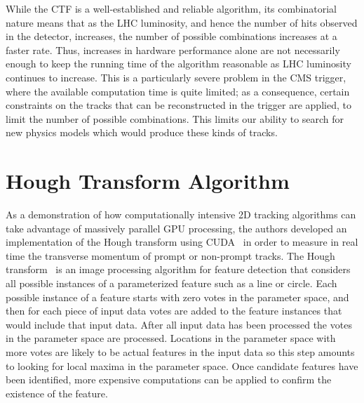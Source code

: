 \documentclass[preprint,sort&compress]{elsarticle}
\begin{document}
While the CTF is a well-established and reliable algorithm, its combinatorial nature means that as the LHC
luminosity, and hence the number of hits observed in the detector, increases, the number of possible
combinations increases at a faster rate. Thus, increases in hardware performance alone are not necessarily
enough to keep the running time of the algorithm reasonable as LHC luminosity continues to increase. This is a
particularly severe problem in the CMS trigger, where the available computation time is quite limited; as a
consequence, certain constraints on the tracks that can be reconstructed in the trigger are applied, to limit
the number of possible combinations. This limits our ability to search for new physics models which would
produce these kinds of tracks.

\section{Hough Transform Algorithm}

As a demonstration of how computationally intensive 2D tracking algorithms can take advantage of massively parallel GPU processing, the authors developed an implementation of the Hough transform using CUDA~\cite{Halyo:2013} in order to measure in real time the transverse momentum of prompt or non-prompt tracks.  The Hough transform~\cite{bib:HT1,bib:HT2,bib:HT3} is an image processing algorithm for feature detection that considers all possible instances of a parameterized feature such as a line or circle.  Each possible instance of a feature starts with zero votes in the parameter space, and then for each piece of input data votes are added to the feature instances that would include that input data.  After all input data has been processed the votes in the parameter space are processed.  Locations in the parameter space with more votes are likely to be actual features in the input data so this step amounts to looking for local maxima in the parameter space.  Once candidate features have been identified, more expensive computations can be applied to confirm the existence of the feature.
\end{document}
